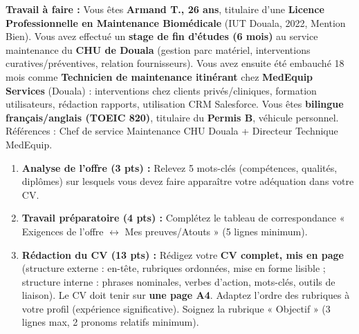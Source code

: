 \documentclass[11pt]{article}
\begin{document}
\begin{exercice}
\textbf{Travail à faire :}
Vous êtes \textbf{Armand T., 26 ans}, titulaire d'une \textbf{Licence Professionnelle en Maintenance Biomédicale} (IUT Douala, 2022, Mention Bien). Vous avez effectué un \textbf{stage de fin d'études (6 mois)} au service maintenance du \textbf{CHU de Douala} (gestion parc matériel, interventions curatives/préventives, relation fournisseurs). Vous avez ensuite été embauché 18 mois comme \textbf{Technicien de maintenance itinérant} chez \textbf{MedEquip Services} (Douala) : interventions chez clients privés/cliniques, formation utilisateurs, rédaction rapports, utilisation CRM Salesforce. Vous êtes \textbf{bilingue français/anglais (TOEIC 820)}, titulaire du \textbf{Permis B}, véhicule personnel. Références : Chef de service Maintenance CHU Douala + Directeur Technique MedEquip.

\begin{enumerate}
\item \textbf{Analyse de l'offre (3 pts) :} Relevez 5 mots-clés (compétences, qualités, diplômes) sur lesquels vous devez faire apparaître votre adéquation dans votre CV.
\item \textbf{Travail préparatoire (4 pts) :} Complétez le tableau de correspondance « Exigences de l'offre $\leftrightarrow$ Mes preuves/Atouts » (5 lignes minimum).
\item \textbf{Rédaction du CV (13 pts) :} Rédigez votre \textbf{CV complet, mis en page} (structure externe : en-tête, rubriques ordonnées, mise en forme lisible ; structure interne : phrases nominales, verbes d'action, mots-clés, outils de liaison). Le CV doit tenir sur \textbf{une page A4}. Adaptez l'ordre des rubriques à votre profil (expérience significative). Soignez la rubrique « Objectif » (3 lignes max, 2 pronoms relatifs minimum).
\end{enumerate}
\end{exercice}
\end{document}

